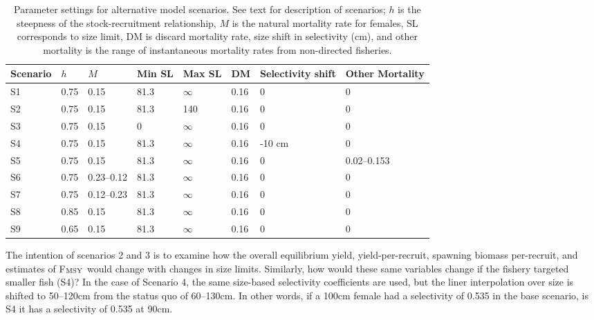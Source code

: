 \begin{table}[!tbh]
	\caption{Parameter settings for alternative model scenarios.  See text for description of scenarios; $h$ is the steepness of the stock-recruitment relationship, $M$ is the natural mortality rate for females, SL corresponds to size limit, DM is discard mortality rate, size shift in selectivity (cm), and other mortality is the range of instantaneous mortality rates from non-directed fisheries.}
	\label{table:Scenarios}
	\begin{center}
	\begin{tabular}{lll lll ll}
		\hline
		Scenario & $h$ & $M$        & Min  SL & Max SL     & DM   &Selectivity shift & Other Mortality  \\
		\hline                                
		S1       &0.75 & 0.15       & 81.3    & $\infty$   & 0.16 & 0                & 0                \\
		S2       &0.75 & 0.15       & 81.3    & 140        & 0.16 & 0                & 0                \\
		S3       &0.75 & 0.15       & 0       & $\infty$   & 0.16 & 0                & 0                \\
		S4       &0.75 & 0.15       & 81.3    & $\infty$   & 0.16 & -10 cm           & 0                \\
		S5       &0.75 & 0.15       & 81.3    & $\infty$   & 0.16 & 0                & 0.02--0.153      \\
		S6       &0.75 & 0.23--0.12 & 81.3    & $\infty$   & 0.16 & 0                & 0                \\
		S7       &0.75 & 0.12--0.23 & 81.3    & $\infty$   & 0.16 & 0                & 0                \\
		S8       &0.85 & 0.15       & 81.3    & $\infty$   & 0.16 & 0                & 0                \\
		S9       &0.65 & 0.15       & 81.3    & $\infty$   & 0.16 & 0                & 0                \\
		\hline
	\end{tabular}
	\end{center}
\end{table}

The intention of scenarios 2 and 3 is to examine how the overall equilibrium yield, yield-per-recruit, spawning biomass per-recruit, and estimates of F$_{\rm{MSY}}$ would change with changes in size limits.  Similarly, how would these same variables change if the fishery targeted smaller fish (S4)?  In the case of Scenario 4, the same size-based selectivity coefficients are used, but the liner interpolation over size is shifted to 50--120cm from the status quo of 60--130cm.  In other words, if a 100cm female had a selectivity of 0.535 in the base scenario, is S4 it has a selectivity of 0.535 at 90cm.  


